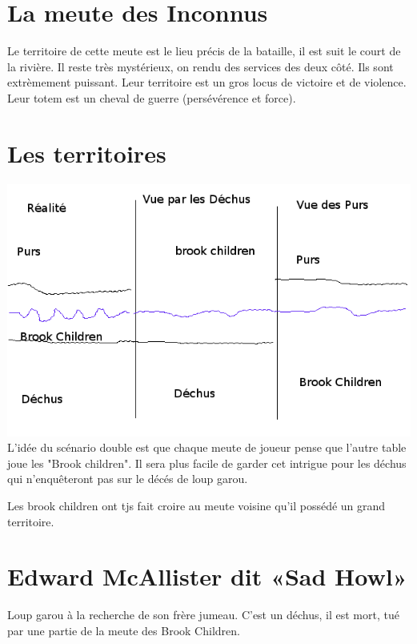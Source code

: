 \documentclass[oneside,12pt]{book}
\begin{document}
\begin{flushleft}
\section{La meute des Inconnus}
Le territoire de cette meute est le lieu précis de la bataille, il est suit le court de la rivière.
Il reste très mystérieux, on rendu des services des deux côté. Ils sont extrèmement puissant. Leur territoire est un gros locus de victoire et de violence. 
Leur totem est un cheval de guerre (persévérence et force). 


\section{Les territoires}
\includegraphics[scale=0.5]{schemaPurDechu.png} \\

L'idée du scénario double est que chaque meute de joueur pense que l'autre table joue les "Brook children". Il sera plus facile de garder cet intrigue pour les déchus qui n'enquêteront pas sur le décés de loup garou.

Les brook children ont tjs fait croire au meute voisine qu'il possédé un grand territoire.

\section{Edward McAllister dit «Sad Howl»}
Loup garou à la recherche de son frère jumeau.
C'est un déchus, il est mort, tué par une partie de la meute des Brook Children. 



\end{flushleft}
\end{document}
